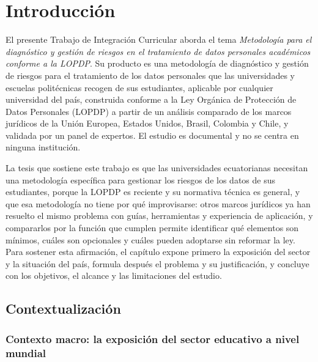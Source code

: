 \chapter{Introducción}
\label{chap:introduccion}


El presente Trabajo de Integración Curricular aborda el tema \textit{Metodología para el diagnóstico y gestión de riesgos en el tratamiento de datos personales académicos conforme a la LOPDP}. Su producto es una metodología de diagnóstico y gestión de riesgos para el tratamiento de los datos personales que las universidades y escuelas politécnicas recogen de sus estudiantes, aplicable por cualquier universidad del país, construida conforme a la Ley Orgánica de Protección de Datos Personales (LOPDP) a partir de un análisis comparado de los marcos jurídicos de la Unión Europea, Estados Unidos, Brasil, Colombia y Chile, y validada por un panel de expertos. El estudio es documental y no se centra en ninguna institución.

La tesis que sostiene este trabajo es que las universidades ecuatorianas necesitan una metodología específica para gestionar los riesgos de los datos de sus estudiantes, porque la LOPDP es reciente y su normativa técnica es general, y que esa metodología no tiene por qué improvisarse: otros marcos jurídicos ya han resuelto el mismo problema con guías, herramientas y experiencia de aplicación, y compararlos por la función que cumplen permite identificar qué elementos son mínimos, cuáles son opcionales y cuáles pueden adoptarse sin reformar la ley. Para sostener esta afirmación, el capítulo expone primero la exposición del sector y la situación del país, formula después el problema y su justificación, y concluye con los objetivos, el alcance y las limitaciones del estudio.

\section{Contextualización}

\subsection{Contexto macro: la exposición del sector educativo a nivel mundial}

